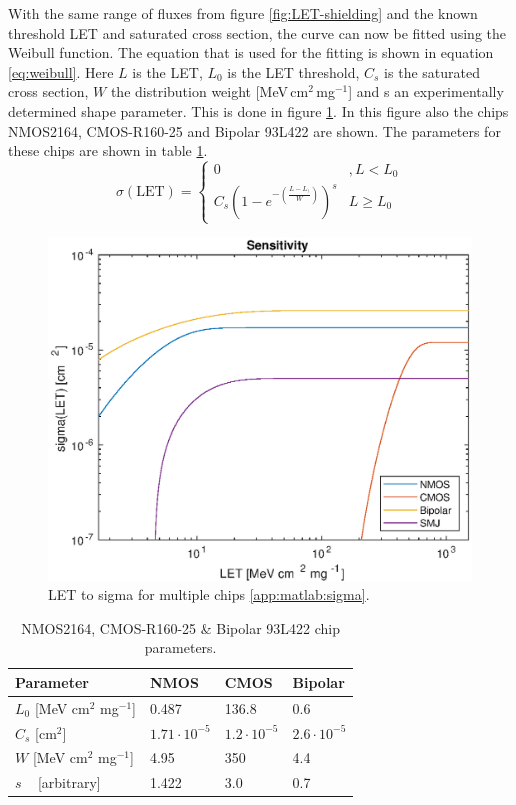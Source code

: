 With the same range of fluxes from figure \ref{fig:LET-shielding} and the known threshold LET and saturated cross section, the curve can now be fitted using the Weibull function. The equation that is used for the fitting is shown in equation \ref{eq:weibull}. Here $L$ is the LET, $L_0$ is the LET threshold, $C_s$ is the saturated cross section, $W$ the distribution weight [MeV\,cm$^2$\,mg$^{-1}$] and s an experimentally determined shape parameter. This is done in figure \ref{fig:matlab:LET-sigma-all}. In this figure also the chips NMOS2164, CMOS-R160-25 and Bipolar 93L422 are shown. The parameters for these chips are shown in table \ref{tab:all-LET}.
\begin{equation}
\sigma(\text{LET}) = \begin{cases}0 & , L < L_0 \\ C_s \left( 1- e^{-\left( \frac{L - L_)}{W}\right)} \right)^s & L \geq L_0 \end{cases} \label{eq:weibull}
\end{equation}

\begin{figure}[H]
\centering
\includegraphics[width=.7\textwidth]{data/sigma/sensitivity.eps}
\caption{LET to sigma for multiple chips \ref{app:matlab:sigma}.}
\label{fig:matlab:LET-sigma-all}
\end{figure}

\begin{table}[H]
\centering
\begin{tabular}{|l|l|l|l|}
\hline
\textbf{Parameter} & \textbf{NMOS} & \textbf{CMOS} & \textbf{Bipolar} \\\hline

$L_0$ [MeV cm$^2$ mg$^{-1}$] & 0.487 & 136.8 & 0.6 \\\hline
$C_s$ [cm$^2$] & $1.71 \cdot 10^{-5}$ & $1.2 \cdot 10^{-5}$ & $2.6 \cdot 10^{-5}$ \\\hline
$W$   [MeV cm$^2$ mg$^{-1}$] & 4.95 & 350 & 4.4 \\\hline
$s$  ~ [arbitrary] & 1.422 & 3.0 & 0.7 \\\hline

\end{tabular}
\caption{NMOS2164, CMOS-R160-25 \& Bipolar 93L422 chip parameters.}
\label{tab:all-LET}
\end{table}



